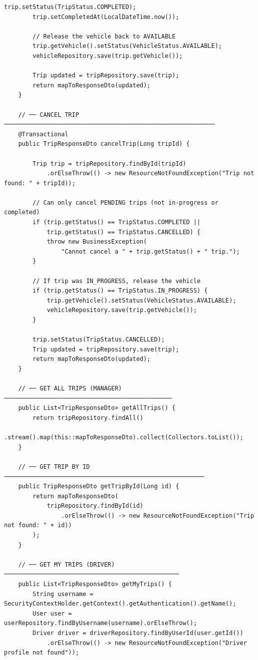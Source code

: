 \documentclass[12pt,a4paper]{report}
\begin{document}
\begin{lstlisting}[caption=TripService.java -- Full Business Logic]
        trip.setStatus(TripStatus.COMPLETED);
        trip.setCompletedAt(LocalDateTime.now());

        // Release the vehicle back to AVAILABLE
        trip.getVehicle().setStatus(VehicleStatus.AVAILABLE);
        vehicleRepository.save(trip.getVehicle());

        Trip updated = tripRepository.save(trip);
        return mapToResponseDto(updated);
    }

    // ── CANCEL TRIP ───────────────────────────────────────────────────────────
    @Transactional
    public TripResponseDto cancelTrip(Long tripId) {

        Trip trip = tripRepository.findById(tripId)
            .orElseThrow(() -> new ResourceNotFoundException("Trip not found: " + tripId));

        // Can only cancel PENDING trips (not in-progress or completed)
        if (trip.getStatus() == TripStatus.COMPLETED ||
            trip.getStatus() == TripStatus.CANCELLED) {
            throw new BusinessException(
                "Cannot cancel a " + trip.getStatus() + " trip.");
        }

        // If trip was IN_PROGRESS, release the vehicle
        if (trip.getStatus() == TripStatus.IN_PROGRESS) {
            trip.getVehicle().setStatus(VehicleStatus.AVAILABLE);
            vehicleRepository.save(trip.getVehicle());
        }

        trip.setStatus(TripStatus.CANCELLED);
        Trip updated = tripRepository.save(trip);
        return mapToResponseDto(updated);
    }

    // ── GET ALL TRIPS (MANAGER) ───────────────────────────────────────────────
    public List<TripResponseDto> getAllTrips() {
        return tripRepository.findAll()
            .stream().map(this::mapToResponseDto).collect(Collectors.toList());
    }

    // ── GET TRIP BY ID ────────────────────────────────────────────────────────
    public TripResponseDto getTripById(Long id) {
        return mapToResponseDto(
            tripRepository.findById(id)
                .orElseThrow(() -> new ResourceNotFoundException("Trip not found: " + id))
        );
    }

    // ── GET MY TRIPS (DRIVER) ─────────────────────────────────────────────────
    public List<TripResponseDto> getMyTrips() {
        String username = SecurityContextHolder.getContext().getAuthentication().getName();
        User user = userRepository.findByUsername(username).orElseThrow();
        Driver driver = driverRepository.findByUserId(user.getId())
            .orElseThrow(() -> new ResourceNotFoundException("Driver profile not found"));


\end{lstlisting}
\end{document}
